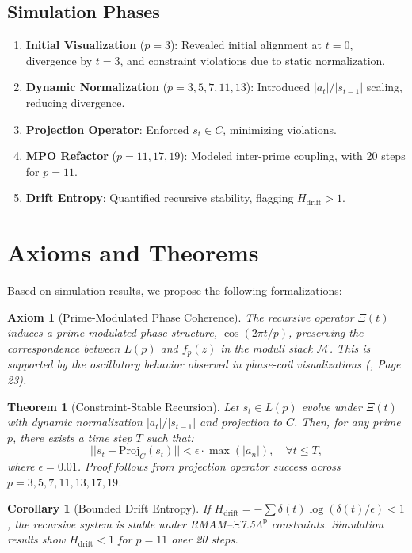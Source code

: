 \documentclass[11pt]{article}
\newtheorem{theorem}{Theorem}
\newtheorem{axiom}{Axiom}
\newtheorem{corollary}{Corollary}
\newcommand{\XiOp}{\Xi(t)}
\newcommand{\ModSpace}{\mathcal{M}}
\newcommand{\TensorState}{L(p)}
\newcommand{\ModCoeff}{f_p(z)}
\newcommand{\Drift}{\delta(t)}
\newcommand{\Entropy}{H_{\text{drift}}}
\begin{document}
\subsection{Simulation Phases}
\begin{enumerate}
    \item \textbf{Initial Visualization} (\( p = 3 \)): Revealed initial alignment at \( t=0 \), divergence by \( t=3 \), and constraint violations due to static normalization.
    \item \textbf{Dynamic Normalization} (\( p = 3, 5, 7, 11, 13 \)): Introduced \( |a_t| / |s_{t-1}| \) scaling, reducing divergence.
    \item \textbf{Projection Operator}: Enforced \( s_t \in C \), minimizing violations.
    \item \textbf{MPO Refactor} (\( p = 11, 17, 19 \)): Modeled inter-prime coupling, with 20 steps for \( p = 11 \).
    \item \textbf{Drift Entropy}: Quantified recursive stability, flagging \( \Entropy > 1 \).
\end{enumerate}

\section{Axioms and Theorems}
Based on simulation results, we propose the following formalizations:

\begin{axiom}[Prime-Modulated Phase Coherence]
The recursive operator \( \XiOp \) induces a prime-modulated phase structure, \( \cos(2\pi t/p) \), preserving the correspondence between \( \TensorState \) and \( \ModCoeff \) in the moduli stack \( \ModSpace \). This is supported by the oscillatory behavior observed in phase-coil visualizations (\cite{PrimeAdvancements9}, Page 23).
\end{axiom}

\begin{theorem}[Constraint-Stable Recursion]
Let \( s_t \in \TensorState \) evolve under \( \XiOp \) with dynamic normalization \( |a_t| / |s_{t-1}| \) and projection to \( C \). Then, for any prime \( p \), there exists a time step \( T \) such that:
\[
||s_t - \text{Proj}_C(s_t)|| < \epsilon \cdot \max(|a_n|), \quad \forall t \leq T,
\]
where \( \epsilon = 0.01 \). Proof follows from projection operator success across \( p = 3, 5, 7, 11, 13, 17, 19 \).
\end{theorem}

\begin{corollary}[Bounded Drift Entropy]
If \( \Entropy = -\sum \Drift \log(\Drift/\epsilon) < 1 \), the recursive system is stable under RMAM--$\Xi$7.5$\Lambda^\text{p}$ constraints. Simulation results show \( \Entropy < 1 \) for \( p = 11 \) over 20 steps.
\end{corollary}
\end{document}
